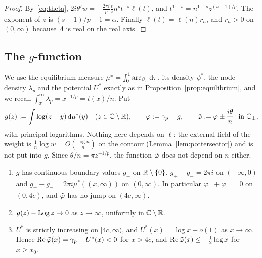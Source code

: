 \begin{proof}
By~\eqref{eq:theta}, $2i\theta'w=-\frac{2\pi i}{p}\frac{t}{z}n^pt^{-s}\ell(t)$, and $t^{1-s}=n^{1-s}z^{(s-1)/p}$.
The exponent of $z$ is $(s-1)/p-1=\alpha$. Finally $\ell(t)=\ell(n)r_n$, and $r_n>0$ on $(0,\infty)$ because
$\Lambda$ is real on the real axis.
\end{proof}

\subsection{\texorpdfstring{The $g$-function}{The g-function}}\label{sec:frame-g}
We use the equilibrium measure $\mu^*=\int_0^1\mathrm{arc}_{\beta_\tau}\,\mathrm{d}\tau$, its density $\psi^*$, the node
density $\lambda_p$ and the potential $U^*$ exactly as in Proposition~\ref{prop:equilibrium}, and we recall
$\int_x^\infty\lambda_p=x^{-1/p}=t(x)/n$. Put
\begin{equation}\label{eq:g}
  g(z):=\int\log(z-y)\,\mathrm{d}\mu^*(y)\quad(z\in\mathbb{C}\setminus\mathbb{R}),\qquad
  \varphi:=\gamma_p-g,\qquad \tilde\varphi:=\varphi\pm\frac{i\theta}{n}\ \text{ in }\mathbb{C}_\pm,
\end{equation}
with principal logarithms. Nothing here depends on $\ell$: the external field of the weight is
$\frac1n\log w=O(\frac{\log n}{n})$ on the contour (Lemma~\ref{lem:pottersector}) and is not put into $g$. Since
$\theta/n=\pi z^{-1/p}$, the function $\tilde\varphi$ does not depend on $n$ either.

\begin{lemma}[$g$-function]\label{lem:gfunction}
\begin{enumerate}
\item[(i)] $g$ has continuous boundary values $g_\pm$ on $\mathbb{R}\setminus\{0\}$, $g_+-g_-=2\pi i$ on $(-\infty,0)$ and
  $g_+-g_-=2\pi i\mu^*((x,\infty))$ on $(0,\infty)$. In particular $\varphi_++\varphi_-=0$ on $(0,4c)$, and $\tilde\varphi$
  has no jump on $(4c,\infty)$.
\item[(ii)] $g(z)-\operatorname{Log} z\to0$ as $z\to\infty$, uniformly in $\mathbb{C}\setminus\mathbb{R}$.
\item[(iii)] $U^*$ is strictly increasing on $[4c,\infty)$, and $U^*(x)=\log x+o(1)$ as $x\to\infty$. Hence
  $\operatorname{Re}\tilde\varphi(x)=\gamma_p-U^*(x)<0$ for $x>4c$, and $\operatorname{Re}\tilde\varphi(x)\le-\frac12\log x$ for $x\ge x_0$.
\end{enumerate}
\end{lemma}

